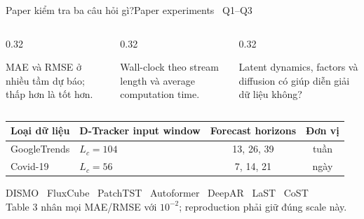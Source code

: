 \documentclass[aspectratio=169,11pt]{beamer}
\begin{document}
\begin{frame}[shrink=21]{Paper kiểm tra ba câu hỏi gì?}{Paper experiments \textperiodcentered\ Q1--Q3}
\begin{columns}[T,onlytextwidth]
\begin{column}{0.32\textwidth}
\begin{intuition}
  MAE và RMSE ở nhiều tầm dự báo; thấp hơn là tốt hơn.
\end{intuition}
\end{column}
\begin{column}{0.32\textwidth}
\begin{mathcard}
  Wall-clock theo stream length và average computation time.
\end{mathcard}
\end{column}
\begin{column}{0.32\textwidth}
\begin{takeaway}
  Latent dynamics, factors và diffusion có giúp diễn giải dữ liệu không?
\end{takeaway}
\end{column}
\end{columns}
\vspace{5mm}
\centering
{\small
\begin{tabular}{@{}llcc@{}}
  \toprule
  Loại dữ liệu & D-Tracker input window & Forecast horizons & Đơn vị\\
  \midrule
  GoogleTrends & $L_c=104$ & 13, 26, 39 & tuần\\
  Covid-19 & $L_c=56$ & 7, 14, 21 & ngày\\
  \bottomrule
\end{tabular}}
\vspace{4mm}
\begin{questioncard}
  \par
  DISMO \textperiodcentered\ FluxCube \textperiodcentered\ PatchTST \textperiodcentered\ Autoformer \textperiodcentered\ DeepAR \textperiodcentered\ LaST \textperiodcentered\ CoST\\[1mm]
  {\small Table 3 nhân mọi MAE/RMSE với $10^{-2}$; reproduction phải giữ đúng scale này.}
\end{questioncard}
\vspace{2mm}
\end{frame}
\end{document}
